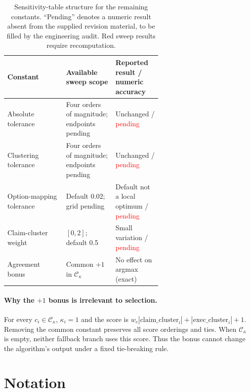 \documentclass{article}
\newcommand{\recheck}[1]{\textcolor{red}{#1}}
\begin{document}
\begin{table}[h]
\centering
\caption{Sensitivity-table structure for the remaining constants. ``Pending'' denotes a numeric result absent from the supplied revision material, to be filled by the engineering audit. Red sweep results require recomputation.}
\label{tab:constants}
\small
\begin{tabular}{lp{0.32\linewidth}p{0.30\linewidth}}
\toprule
Constant & Available sweep scope & Reported result / numeric accuracy \\
\midrule
Absolute tolerance & Four orders of magnitude; endpoints pending & Unchanged / \recheck{pending} \\
Clustering tolerance & Four orders of magnitude; endpoints pending & Unchanged / \recheck{pending} \\
Option-mapping tolerance & Default 0.02; grid pending & Default not a local optimum / \recheck{pending} \\
Claim-cluster weight & $[0,2]$; default 0.5 & Small variation / \recheck{pending} \\
Agreement bonus & Common $+1$ in $\mathcal C_\kappa$ & No effect on argmax (exact) \\
\bottomrule
\end{tabular}
\end{table}

\paragraph{Why the $+1$ bonus is irrelevant to selection.}
For every $c_i\in\mathcal C_\kappa$, $\kappa_i=1$ and the score is $w_c|\mathrm{claim\_cluster}_i|+|\mathrm{exec\_cluster}_i|+1$. Removing the common constant preserves all score orderings and ties. When $\mathcal C_\kappa$ is empty, neither fallback branch uses this score. Thus the bonus cannot change the algorithm's output under a fixed tie-breaking rule.

\clearpage
\section{Notation}
\label{app:notation}
\end{document}
